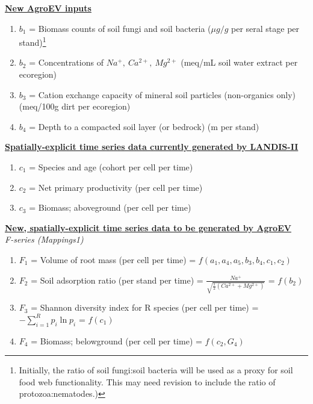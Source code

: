 \noindent \textbf{\underline{New AgroEV inputs}}
\begin{enumerate}
  \item $b_1$ = Biomass counts of soil fungi and soil bacteria ($\mu g / g$ per seral stage per stand)\footnote{Initially, the ratio of soil fungi:soil bacteria will be used as a proxy for soil food web functionality. This may need revision to include the ratio of protozoa:nematodes.)} 
  \item $b_2$ = Concentrations of $Na^{+}, \ Ca^{2+}, \ Mg^{2+}$ (meq/mL soil water extract per ecoregion)
  \item $b_3$ = Cation exchange capacity of mineral soil particles (non-organics only) (meq/100g dirt per ecoregion)
  \item $b_4$ = Depth to a compacted soil layer (or bedrock) (m per stand)
\end{enumerate}

\vspace{5 mm}

\noindent \textbf{\underline{Spatially-explicit time series data currently generated by LANDIS-II}}

\begin{enumerate}
  \item $c_1$ = Species and age (cohort per cell per time)
  \item $c_2$ = Net primary productivity (per cell per time)
  \item $c_3$ = Biomass; aboveground (per cell per time)
\end{enumerate}


\vspace{5 mm}

\noindent \textbf{\underline{New, spatially-explicit time series data to be generated by AgroEV}}\\

\noindent \textit{F-series (Mappings1)}
\begin{enumerate}
  \item $F_1$ = Volume of root mass (per cell per time) = $f(a_1, a_4, a_5, b_3, b_4, c_1, c_2)$
  \item $F_2$ = Soil adsorption ratio (per stand per time) = $ {\frac {Na^{+}}{\sqrt {{\tfrac {1}{2}}({Ca^{2+}+Mg^{2+}})}}}$ = $f(b_2)$
  \item $F_3$ = Shannon diversity index for R species (per cell per time) = $-\sum _{i=1}^{R}p_{i}\ln p_{i}$ = $ f(c_1)$
  \item $F_4$ = Biomass; belowground (per cell per time) = $ f(c_2, G_4) $ 
\end{enumerate}

